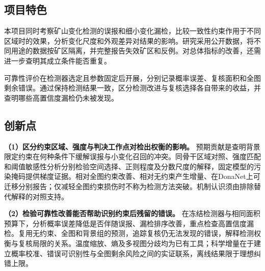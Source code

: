 \subsection{项目特色}
本项目同时考察矿山变化检测的误报和细小变化漏检，比较一致性约束作用于不同区域时的效果，分析变化尺度和外观差异对结果的影响。研究采用公开数据，将不同用途的数据按矿区隔离，并完整报告失效矿区和反例。对总体指标的改善，还需进一步查明其成立条件能否重复。

可靠性评价在检测器选定且参数固定后开展，分别记录概率误差、复核面积和全图剩余错误。通过保持检测结果一致，区分检测改进与复核选择各自带来的收益，并查明哪些高置信度漏检仍未被发现。

\subsection{创新点}
\textbf{（1）区分约束区域、强度与判决工作点对检出权衡的影响。}
预期贡献是查明背景限定约束在何种条件下缓解误报与小变化召回的冲突。同骨干区域对照、强度匹配和阈值敏感性分析分别检验空间选择、正则程度及分数尺度的解释，固定模型的污染掩码提供梯度证据。相对全图约束改善、相对无约束产生增量、在DonaNet上可迁移分别报告；仅减轻全图约束损伤时不称为检测方法突破。机制认识须由排除替代解释的对照支持。

\textbf{（2）检验可靠性改善能否帮助识别约束后残留的错误。}
在冻结检测器与相同面积预算下，分析概率误差降低是否伴随误报、漏检排序改善，重点检查高置信度漏检。复用无约束、全图和背景组的预测，追踪复核仍无法发现的错误，解释检测权衡与复核局限的关系。温度缩放、熵及多视图分歧均为已有工具；科学增量在于建立概率校准、错误可识别性与全图剩余风险之间的实证联系，离线结果限于理想纠错上限。
